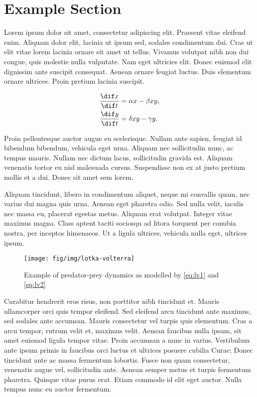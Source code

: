 \section{Example Section}
\label{sec:lvdiffeq}

Lorem ipsum dolor sit amet, consectetur adipiscing elit.
Praesent vitae eleifend enim.
Aliquam dolor elit, lacinia ut ipsum sed, sodales condimentum dui.
Cras ut elit vitae lorem lacinia ornare sit amet ut tellus.
Vivamus volutpat nibh non dui congue, quis molestie nulla vulputate.
Nam eget ultricies elit.
Donec euismod elit dignissim ante suscipit consequat.
Aenean ornare feugiat luctus.
Duis elementum ornare ultrices.
Proin pretium lacinia suscipit.

\begin{align}
  \frac{\dif x}{\dif t} &= \alpha x - \beta x y, \label{eq:lv1} \\
  \frac{\dif y}{\dif t} &= \delta xy - \gamma y .\label{eq:lv2}
\end{align}

Proin pellentesque auctor augue eu scelerisque.
Nullam ante sapien, feugiat id bibendum bibendum, vehicula eget urna.
Aliquam nec sollicitudin nunc, ac tempus mauris.
Nullam nec dictum lacus, sollicitudin gravida est.
Aliquam venenatis tortor eu nisl malesuada cursus.
Suspendisse non ex at justo pretium mollis et a dui.
Donec sit amet sem lorem.

Aliquam tincidunt, libero in condimentum aliquet, neque mi convallis quam, nec varius dui magna quis urna.
Aenean eget pharetra odio.
Sed nulla velit, iaculis nec massa eu, placerat egestas metus.
Aliquam erat volutpat.
Integer vitae maximus magna.
Class aptent taciti sociosqu ad litora torquent per conubia nostra, per inceptos himenaeos.
Ut a ligula ultrices, vehicula nulla eget, ultrices ipsum.

\begin{figure}[htbp]
  \centering
  \texttt{[image: fig/img/lotka-volterra]}
  \caption{Example of predator-prey dynamics as modelled by \eqref{eq:lv1} and \eqref{eq:lv2}}
  \label{fig:lvgraph}
\end{figure}

Curabitur hendrerit eros risus, non porttitor nibh tincidunt et.
Mauris ullamcorper orci quis tempor eleifend.
Sed eleifend arcu tincidunt ante maximus, sed sodales ante accumsan.
Mauris consectetur vel turpis quis elementum.
Cras a arcu tempor, rutrum velit et, maximus velit.
Aenean faucibus nulla ipsum, sit amet euismod ligula tempor vitae.
Proin accumsan a nunc in varius.
Vestibulum ante ipsum primis in faucibus orci luctus et ultrices posuere cubilia Curae; Donec tincidunt ante ac massa fermentum lobortis.
Fusce non quam consectetur, venenatis augue vel, sollicitudin ante.
Aenean semper metus et turpis fermentum pharetra.
Quisque vitae purus erat.
Etiam commodo id elit eget auctor.
Nulla tempus nunc eu auctor fermentum.
